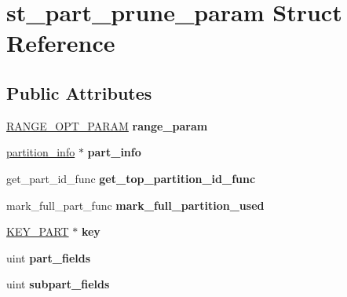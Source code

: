 \hypertarget{structst__part__prune__param}{}\section{st\+\_\+part\+\_\+prune\+\_\+param Struct Reference}
\label{structst__part__prune__param}
\subsection*{Public Attributes}
\begin{DoxyCompactItemize}
\item 
\mbox{\label{structst__part__prune__param_aa2f597ecebc5ababface8fabf8f372ff}} 
\mbox{\hyperlink{classRANGE__OPT__PARAM}{R\+A\+N\+G\+E\+\_\+\+O\+P\+T\+\_\+\+P\+A\+R\+AM}} {\bfseries range\+\_\+param}
\item 
\mbox{\label{structst__part__prune__param_a67ed491a69fcee91c5b3411f826e6876}} 
\mbox{\hyperlink{classpartition__info}{partition\+\_\+info}} $\ast$ {\bfseries part\+\_\+info}
\item 
\mbox{\label{structst__part__prune__param_a98db108211cc4248cf5111536ec75cac}} 
get\+\_\+part\+\_\+id\+\_\+func {\bfseries get\+\_\+top\+\_\+partition\+\_\+id\+\_\+func}
\item 
\mbox{\label{structst__part__prune__param_a9e7d57edb70028e7ee8c75c0336b0f7a}} 
mark\+\_\+full\+\_\+part\+\_\+func {\bfseries mark\+\_\+full\+\_\+partition\+\_\+used}
\item 
\mbox{\label{structst__part__prune__param_a140f29bf1861d93365ad3745830fc30b}} 
\mbox{\hyperlink{structst__key__part}{K\+E\+Y\+\_\+\+P\+A\+RT}} $\ast$ {\bfseries key}
\item 
\mbox{\label{structst__part__prune__param_ad9087bf548f5206d67bbfc7938688cd8}} 
uint {\bfseries part\+\_\+fields}
\item 
\mbox{\label{structst__part__prune__param_a3a277d742f413e121a63b11d5c8fb878}} 
uint {\bfseries subpart\+\_\+fields}

\end{DoxyCompactItemize}
